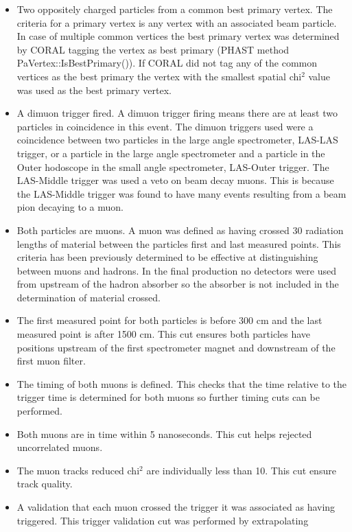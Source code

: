\begin{itemize}
\item Two oppositely charged particles from a common best primary vertex.  The
  criteria for a primary vertex is any vertex with an associated beam particle.
  In case of multiple common vertices the best primary vertex was determined by
  CORAL tagging the vertex as best primary (PHAST method
  PaVertex::IsBestPrimary()).  If CORAL did not tag any of the common vertices
  as the best primary the vertex with the smallest spatial chi$^2$ value was
  used as the best primary vertex.
\item A dimuon trigger fired.  A dimuon trigger firing means there are at least
  two particles in coincidence in this event. The dimuon triggers used were a
  coincidence between two particles in the large angle spectrometer, LAS-LAS
  trigger, or a particle in the large angle spectrometer and a particle in the
  Outer hodoscope in the small angle spectrometer, LAS-Outer trigger.  The
  LAS-Middle trigger was used a veto on beam decay muons.  This is because the
  LAS-Middle trigger was found to have many events resulting from a beam pion
  decaying to a muon.
\item Both particles are muons.  A muon was defined as having crossed 30
  radiation lengths of material between the particles first and last measured
  points.  This criteria has been previously determined to be effective at
  distinguishing between muons and hadrons.  In the final production no
  detectors were used from upstream of the hadron absorber so the absorber is
  not included in the determination of material crossed.
\item The first measured point for both particles is before 300 cm and the last
  measured point is after 1500 cm.  This cut ensures both particles have
  positions upstream of the first spectrometer magnet and downstream of the
  first muon filter.
\item The timing of both muons is defined.  This checks that the time relative
  to the trigger time is determined for both muons so further timing cuts can be
  performed.
\item Both muons are in time within 5 nanoseconds.  This cut helps rejected
  uncorrelated muons.
\item The muon tracks reduced chi$^2$ are individually less than 10.  This cut
  ensure track quality.
\item A validation that each muon crossed the trigger it was associated as
  having triggered.  This trigger validation cut was performed by extrapolating

\end{itemize}
